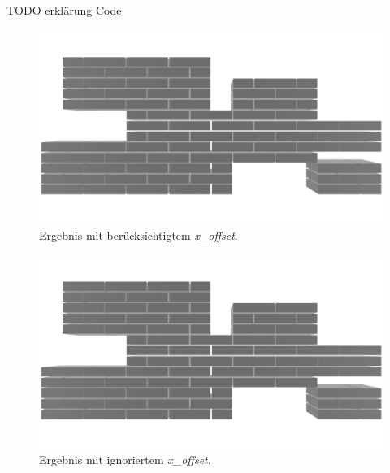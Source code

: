 TODO erklärung Code

\begin{figure}[ht!]
  \centering
  \includegraphics[width=0.8\columnwidth]{fig/Real_Combination_Output.png}
  \caption{Ergebnis mit berücksichtigtem \textit{x\_offset}.}
  \label{fig:real:combination_example_solution_xoffset}
\end{figure}

\begin{figure}[hb!]
  \centering
  \includegraphics[width=0.8\columnwidth]{fig/Real_Combination_Output_No_XOffsetpng.png}
  \caption{Ergebnis mit ignoriertem \textit{x\_offset}.}
  \label{fig:real:combination_example_solution_no_xoffset}
\end{figure}

